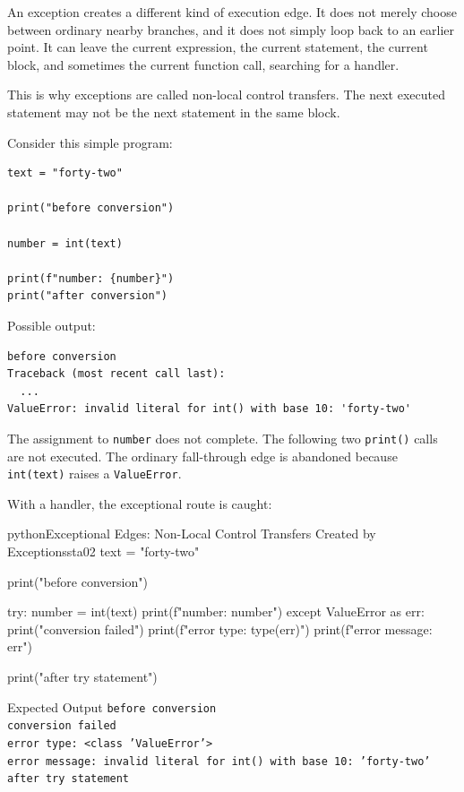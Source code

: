 An exception creates a different kind of execution edge. It does not merely choose between ordinary nearby branches, and it does not simply loop back to an earlier point. It can leave the current expression, the current statement, the current block, and sometimes the current function call, searching for a handler.

This is why exceptions are called non-local control transfers. The next executed statement may not be the next statement in the same block.

Consider this simple program:

\begin{verbatim}
text = "forty-two"

print("before conversion")

number = int(text)

print(f"number: {number}")
print("after conversion")
\end{verbatim}

Possible output:

\begin{verbatim}
before conversion
Traceback (most recent call last):
  ...
ValueError: invalid literal for int() with base 10: 'forty-two'
\end{verbatim}

The assignment to \texttt{number} does not complete. The following two \texttt{print()} calls are not executed. The ordinary fall-through edge is abandoned because \texttt{int(text)} raises a \texttt{ValueError}.

With a handler, the exceptional route is caught:

\begin{codebox}[]{python}{Exceptional Edges: Non-Local Control Transfers Created by Exceptions}{sta02}
text = "forty-two"

print("before conversion")

try:
    number = int(text)
    print(f"number: {number}")
except ValueError as err:
    print("conversion failed")
    print(f"error type: {type(err)}")
    print(f"error message: {err}")

print("after try statement")
\end{codebox}


\begin{iobox}{Expected Output}
\texttt{before conversion} \\
\texttt{conversion failed} \\
\texttt{error type: <class 'ValueError'>} \\
\texttt{error message: invalid literal for int() with base 10: 'forty-two'} \\
\texttt{after try statement} \\
\end{iobox}


